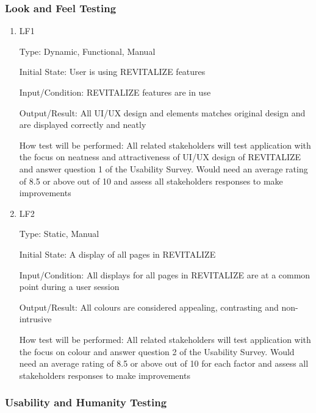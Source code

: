\documentclass[12pt, titlepage]{article}
\begin{document}

\subsubsection{Look and Feel Testing}

\begin{enumerate}
	
	\item{LF1\\}
	
	Type: Dynamic, Functional, Manual
	
	Initial State: User is using REVITALIZE features
	
	Input/Condition: REVITALIZE features are in use
	
	Output/Result: All UI/UX design and elements matches original design and are displayed correctly and neatly
	
	How test will be performed: All related stakeholders will test application with the focus on neatness and attractiveness of UI/UX design of REVITALIZE and answer question 1 of the Usability Survey. Would need an average rating of 8.5 or above out of 10 and assess all stakeholders responses to make improvements
	
	\item{LF2\\}
	
	Type: Static, Manual
	
	Initial State: A display of all pages in REVITALIZE
	
	Input/Condition: All displays for all pages in REVITALIZE are at a common point during a user session
	
	Output/Result: All colours are considered appealing, contrasting and non-intrusive
	
	How test will be performed: All related stakeholders will test application with the focus on colour and answer question 2 of the Usability Survey. Would need an average rating of 8.5 or above out of 10 for each factor and assess all stakeholders responses to make improvements
	
\end{enumerate}

\subsubsection{Usability and Humanity Testing}
\end{document}
